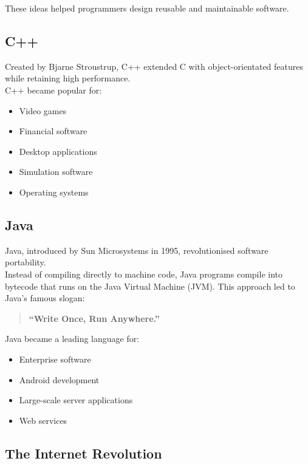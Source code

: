 These ideas helped programmers design reusable and maintainable software.

\subsection{C++}

Created by Bjarne Stroustrup, C++ extended C with object-orientated features while retaining high performance.\\

C++ became popular for:

\begin{itemize}
    \item Video games
    \item Financial software
    \item Desktop applications
    \item Simulation software
    \item Operating systems
\end{itemize}

\subsection{Java}

Java, introduced by Sun Microsystems in 1995, revolutionised software portability.\\

Instead of compiling directly to machine code, Java programs compile into bytecode that runs on the Java Virtual Machine (JVM). This approach led to Java's famous slogan:

\begin{quote}
\textbf{``Write Once, Run Anywhere.''}
\end{quote}

Java became a leading language for:

\begin{itemize}
    \item Enterprise software
    \item Android development
    \item Large-scale server applications
    \item Web services
\end{itemize}

\subsection{The Internet Revolution}

